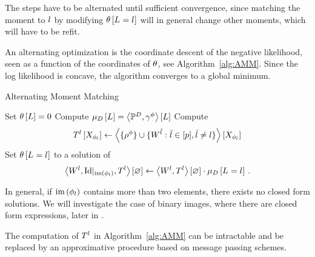 The steps have to be alternated until sufficient convergence, since matching the moment to $l$ by modifying $\theta\left[L_{}=l_{}\right]$ will in general change other moments, which will have to be refit.


An alternating optimization is the coordinate descent of the negative likelihood, seen as a function of the coordinates of $\theta$, see Algorithm~\ref{alg:AMM}.
Since the log likelihood is concave, the algorithm converges to a global minimum.



\begin{algorithm}[h!]
\caption{Alternating Moment Matching}\label{alg:AMM}
\begin{algorithmic}
\State Set $\theta\left[L\right]=0$
\State Compute $\mu_{D}\left[L\right]= \left\langle \mathbb{P}^{D},\gamma^{\phi}\right\rangle \left[ L \right]$
{}
\For{$\selindexin$}
	\State Compute 
		\begin{align*}
			T^{l}\left[X_{\phi_{l}}\right] 
			\leftarrow \left\langle \{\rho^{\phi}\}\cup\{W^{\tilde{l}} : \tilde{l} \in [p], \tilde{l}\neq l\}\right\rangle \left[ X_{\phi_{l}} \right] 
		\end{align*}
	\State Set $\theta\left[L_{}=l_{}\right]$ to a solution of 
	\begin{align*}
		\left\langle W^{l},{\mathrm{Id}}|_{\mathrm{im}\left(\phi_{l}\right)},T^{l}\right\rangle \left[ \varnothing \right]
		\leftarrow \left\langle W^{l},T^{l}\right\rangle \left[ \varnothing \right] \cdot \mu_{D}\left[L_{}=l_{}\right] \, . 
	\end{align*}
\EndFor
\EndWhile
\end{algorithmic}
\end{algorithm}


% 
In general, if $\mathrm{im}\left(\phi_{l}\right)$ contains more than two elements, there exists no closed form solutions.
We will investigate the case of binary images, where there are closed form expressions, later in .


%
The computation of $T^{l}$ in Algorithm~\ref{alg:AMM} can be intractable and be replaced by an approximative procedure based on message passing schemes.

